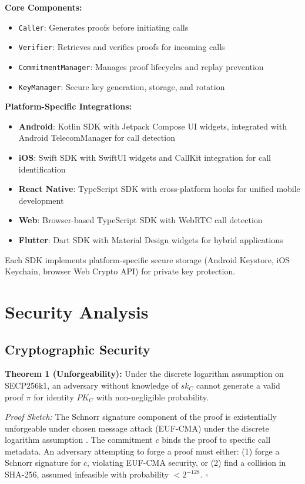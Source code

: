 \documentclass[11pt,twocolumn]{article}
\begin{document}
\textbf{Core Components:}
\begin{itemize}
\item \texttt{Caller}: Generates proofs before initiating calls
\item \texttt{Verifier}: Retrieves and verifies proofs for incoming calls
\item \texttt{CommitmentManager}: Manages proof lifecycles and replay prevention
\item \texttt{KeyManager}: Secure key generation, storage, and rotation
\end{itemize}

\textbf{Platform-Specific Integrations:}
\begin{itemize}
\item \textbf{Android}: Kotlin SDK with Jetpack Compose UI widgets, integrated with Android TelecomManager for call detection
\item \textbf{iOS}: Swift SDK with SwiftUI widgets and CallKit integration for call identification
\item \textbf{React Native}: TypeScript SDK with cross-platform hooks for unified mobile development
\item \textbf{Web}: Browser-based TypeScript SDK with WebRTC call detection
\item \textbf{Flutter}: Dart SDK with Material Design widgets for hybrid applications
\end{itemize}

Each SDK implements platform-specific secure storage (Android Keystore, iOS Keychain, browser Web Crypto API) for private key protection.

\section{Security Analysis}

\subsection{Cryptographic Security}

\textbf{Theorem 1 (Unforgeability):} Under the discrete logarithm assumption on SECP256k1, an adversary without knowledge of $sk_C$ cannot generate a valid proof $\pi$ for identity $PK_C$ with non-negligible probability.

\textit{Proof Sketch:} The Schnorr signature component of the proof is existentially unforgeable under chosen message attack (EUF-CMA) under the discrete logarithm assumption \cite{schnorr1991}. The commitment $c$ binds the proof to specific call metadata. An adversary attempting to forge a proof must either: (1) forge a Schnorr signature for $c$, violating EUF-CMA security, or (2) find a collision in SHA-256, assumed infeasible with probability $< 2^{-128}$. $\square$
\end{document}
